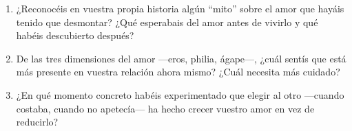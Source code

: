 \paracaminar

\begin{enumerate}
  \item ¿Reconocéis en vuestra propia historia algún ``mito'' sobre el amor que hayáis tenido que desmontar? ¿Qué esperabais del amor antes de vivirlo y qué habéis descubierto después?

  \item De las tres dimensiones del amor ---eros, philia, ágape---, ¿cuál sentís que está más presente en vuestra relación ahora mismo? ¿Cuál necesita más cuidado?

  \item ¿En qué momento concreto habéis experimentado que elegir al otro ---cuando costaba, cuando no apetecía--- ha hecho crecer vuestro amor en vez de reducirlo?
\end{enumerate}

